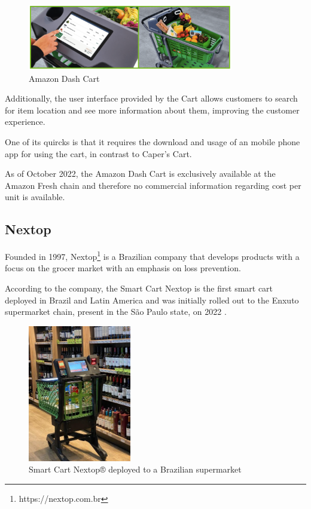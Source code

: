 \documentclass[openright]{normas-utf-tex} %
\begin{document}
\begin{figure}[H]
	\centering
	\includegraphics[width=0.8\textwidth]{./images/dashcart.png}
    \caption[Amazon Dash Cart]{Amazon Dash Cart}
    \label{fig:dashcart}
\end{figure}

Additionally, the user interface provided by the Cart allows customers to search for item location and see more information
about them, improving the customer experience.

One of its quircks is that it requires the download and usage of an mobile phone app for using the cart, in contrast
to Caper's Cart.

As of October 2022, the Amazon Dash Cart is exclusively available at the Amazon
Fresh chain and therefore no commercial information regarding cost per unit is
available.

\subsection{Nextop}

Founded in 1997, Nextop\footnote{https://nextop.com.br} is a Brazilian company
that develops products with a focus on the grocer market with an emphasis on
loss prevention.

According to the company, the Smart Cart Nextop is the first smart cart
deployed in Brazil and Latin America and was initially rolled out to the Enxuto
supermarket chain, present in the São Paulo state, on 2022 \cite{Paraiba2022}.

\begin{figure}[H]
	\centering
	\includegraphics[width=0.4\textwidth]{./images/nextop.jpeg}
	\caption[Smart Cart Nextop® deployed to a Brazilian supermarket]{Smart Cart Nextop® deployed to a Brazilian supermarket}
	\label{fig:nextop}
\end{figure}
\end{document}
